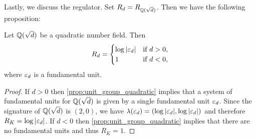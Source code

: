     Lastly, we discuss the regulator. Set $R_{d} = R_{\mathbb{Q}(\sqrt{d})}$. Then we have the following proposition:

    \begin{proposition}\label{prop:regulator_quadratic}
      Let $\mathbb{Q}(\sqrt{d})$ be a quadratic number field. Then
      \[
        R_{d} = \begin{cases} \log|\varepsilon_{d}| & \text{if $d > 0$}, \\ 1 & \text{if $d < 0$}, \end{cases}
      \]
      where $\varepsilon_{d}$ is a fundamental unit.
    \end{proposition}
    \begin{proof}
      If $d > 0$ then \cref{prop:unit_group_quadratic} implies that a system of fundamental units for $\mathbb{Q}(\sqrt{d})$ is given by a single fundamental unit $\varepsilon_{d}$. Since the signature of $\mathbb{Q}(\sqrt{d})$ is $(2,0)$, we have $\lambda(\varepsilon_{d}) = (\log|\varepsilon_{d}|,\log|\varepsilon_{d}|)$ and therefore $R_{K} = \log|\varepsilon_{d}|$. If $d < 0$ then \cref{prop:unit_group_quadratic} implies that there are no fundamental units and thus $R_{K} = 1$.
    \end{proof}
  \section{}